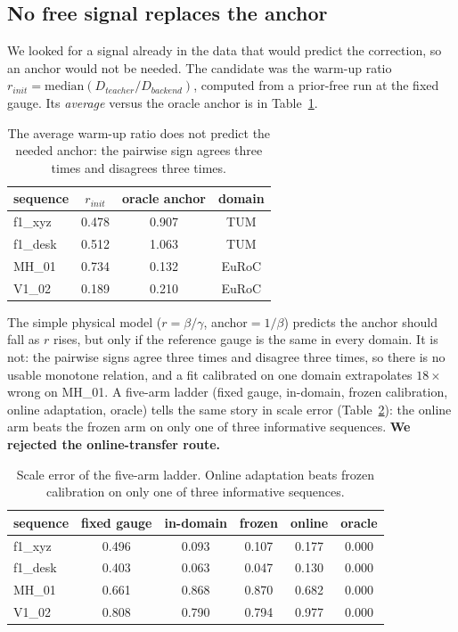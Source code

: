 \subsection{No free signal replaces the anchor}

We looked for a signal already in the data that would predict the correction, so
an anchor would not be needed. The candidate was the warm-up ratio
$r_{init}=\mathrm{median}(D_{teacher}/D_{backend})$, computed from a prior-free
run at the fixed gauge. Its \emph{average} versus the oracle anchor is in
Table~\ref{tab:ratio}.

\begin{table}[t]
\centering
\caption{The average warm-up ratio does not predict the needed anchor: the
pairwise sign agrees three times and disagrees three times.}
\label{tab:ratio}
\small
\begin{tabular}{@{}lccc@{}}
\toprule
sequence & $r_{init}$ & oracle anchor & domain \\
\midrule
f1\_xyz & 0.478 & 0.907 & TUM \\
f1\_desk & 0.512 & 1.063 & TUM \\
MH\_01 & 0.734 & 0.132 & EuRoC \\
V1\_02 & 0.189 & 0.210 & EuRoC \\
\bottomrule
\end{tabular}
\end{table}

The simple physical model ($r=\beta/\gamma$, anchor${}=1/\beta$) predicts the
anchor should fall as $r$ rises, but only if the reference gauge is the same in
every domain. It is not: the pairwise signs agree three times and disagree three
times, so there is no usable monotone relation, and a fit calibrated on one
domain extrapolates $18\times$ wrong on MH\_01. A five-arm ladder (fixed gauge,
in-domain, frozen calibration, online adaptation, oracle) tells the same story in
scale error (Table~\ref{tab:ladder}): the online arm beats the frozen arm on only
one of three informative sequences. \textbf{We rejected the online-transfer
route.}

\begin{table}[t]
\centering
\caption{Scale error of the five-arm ladder. Online adaptation beats frozen
calibration on only one of three informative sequences.}
\label{tab:ladder}
\small
\begin{tabular}{@{}lccccc@{}}
\toprule
sequence & fixed gauge & in-domain & frozen & online & oracle \\
\midrule
f1\_xyz & 0.496 & 0.093 & 0.107 & 0.177 & 0.000 \\
f1\_desk & 0.403 & 0.063 & 0.047 & 0.130 & 0.000 \\
MH\_01 & 0.661 & 0.868 & 0.870 & 0.682 & 0.000 \\
V1\_02 & 0.808 & 0.790 & 0.794 & 0.977 & 0.000 \\
\bottomrule
\end{tabular}
\end{table}

